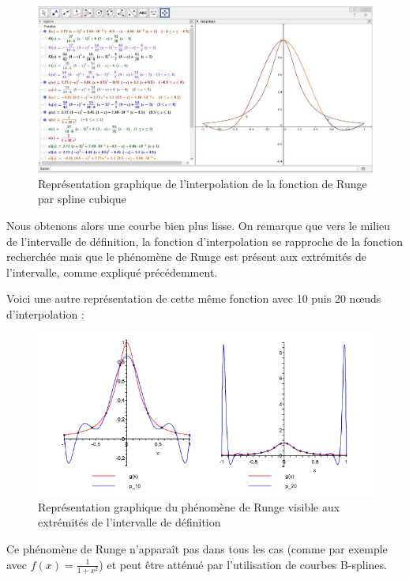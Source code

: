 \documentclass{article}
\begin{document}
\begin{figure}[h]
	\centering
	\includegraphics[width=12cm]{InterpolationRungeSplineCubique.png}
	\caption{Repr\'{e}sentation graphique de l'interpolation de la fonction de Runge par spline cubique }
\end{figure}

\newpage
Nous obtenons alors une courbe bien plus lisse. On remarque que vers le milieu de l'intervalle de d\'{e}finition, la fonction d'interpolation se rapproche de la fonction recherch\'{e}e mais que le ph\'{e}nom\`ene de Runge est pr\'{e}sent aux extr\'{e}mit\'{e}s de l'intervalle, comme expliqu\'{e} pr\'{e}c\'{e}demment.

Voici une autre repr\'{e}sentation de cette m\^{e}me fonction avec 10 puis 20 n\oe uds d'interpolation :

\begin{figure}[h]
	\centering
	\includegraphics[width=12cm]{ExempleFctRunge.png}
	\caption{Repr\'{e}sentation graphique du ph\'{e}nom\`{e}ne de Runge visible aux extr\'{e}mit\'{e}s de l'intervalle de d\'{e}finition }
\end{figure}

Ce ph\'{e}nom\`{e}ne de Runge n'appara\^it pas dans tous les cas (comme par exemple avec $f(x)=\frac{1}{1+x^{2}}$) et peut \^{e}tre att\'{e}nu\'{e} par l'utilisation de courbes B-splines.\\
\end{document}
